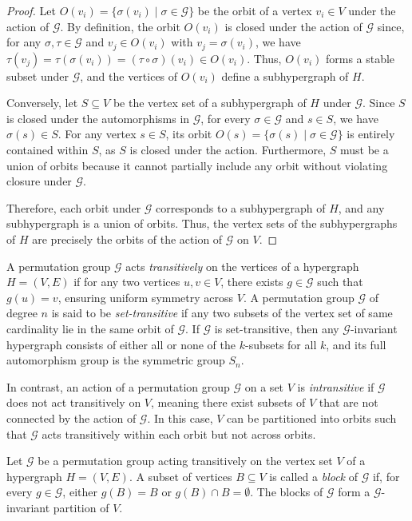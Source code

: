 \begin{proof}
Let $O(v_i)=\{\sigma(v_i)\mid\sigma\in\mathcal{G}\}$ be the orbit of a vertex $v_i\in V$ under the action of $\mathcal{G}$. By definition, the orbit $O(v_i)$ is closed under the action of $\mathcal{G}$ since, for any $\sigma,\tau\in\mathcal{G}$ and $v_j\in O(v_i)$ with $v_j=\sigma(v_i)$, we have $\tau(v_j)=\tau(\sigma(v_i))=(\tau\circ\sigma)(v_i)\in O(v_i)$. Thus, $O(v_i)$ forms a stable subset under $\mathcal{G}$, and the vertices of $O(v_i)$ define a subhypergraph of $H$.

Conversely, let $S\subseteq V$ be the vertex set of a subhypergraph of $H$ under $\mathcal{G}$. Since $S$ is closed under the automorphisms in $\mathcal{G}$, for every $\sigma\in\mathcal{G}$ and $s\in S$, we have $\sigma(s)\in S$. For any vertex $s\in S$, its orbit $O(s)=\{\sigma(s)\mid\sigma\in\mathcal{G}\}$ is entirely contained within $S$, as $S$ is closed under the action. Furthermore, $S$ must be a union of orbits because it cannot partially include any orbit without violating closure under $\mathcal{G}$.

Therefore, each orbit under $\mathcal{G}$ corresponds to a subhypergraph of $H$, and any subhypergraph is a union of orbits. Thus, the vertex sets of the subhypergraphs of $H$ are precisely the orbits of the action of $\mathcal{G}$ on $V$.
\end{proof}

A permutation group $\mathcal{G}$ acts \emph{transitively} on the vertices of a hypergraph $H=(V,E)$ if for any two vertices $u,v\in V$, there exists $g\in\mathcal{G}$ such that $g(u)=v$, ensuring uniform symmetry across $V$. A permutation group $\mathcal{G}$ of degree $n$ is said to be \emph{set-transitive} if any two subsets of the vertex set of same cardinality lie in the same orbit of $\mathcal{G}$. If $\mathcal{G}$ is set-transitive, then any $\mathcal{G}$-invariant hypergraph consists of either all or none of the $k$-subsets for all $k$, and its full automorphism group is the symmetric group $S_n$.

In contrast, an action of a permutation group $\mathcal{G}$ on a set $V$ is \emph{intransitive} if $\mathcal{G}$ does not act transitively on $V$, meaning there exist subsets of $V$ that are not connected by the action of $\mathcal{G}$. In this case, $V$ can be partitioned into orbits such that $\mathcal{G}$ acts transitively within each orbit but not across orbits.

\begin{definition}
Let $\mathcal{G}$ be a permutation group acting transitively on the vertex set $V$ of a hypergraph $H=(V,E)$. A subset of vertices $B\subseteq V$ is called a \emph{block} of $\mathcal{G}$ if, for every $g\in\mathcal{G}$, either $g(B)=B$ or $g(B)\cap B=\emptyset$. The blocks of $\mathcal{G}$ form a $\mathcal{G}$-invariant partition of $V$.
\end{definition}

